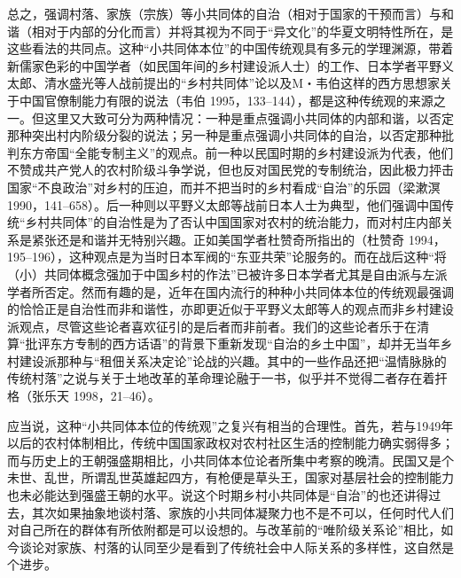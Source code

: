 \documentclass[a4paper,12pt,punct=kaiming,fontset=none]{ctexart}
\begin{document}
总之，强调村落、家族（宗族）等小共同体的自治（相对于国家的干预而言）与和谐（相对于内部的分化而言）并将其视为不同于“异文化”的华夏文明特性所在，是这些看法的共同点。这种“小共同体本位”的中国传统观具有多元的学理渊源，带着新儒家色彩的中国学者（如民国年间的乡村建设派人士）的工作、日本学者平野义太郎、清水盛光等人战前提出的“乡村共同体”论以及M・韦伯这样的西方思想家关于中国官僚制能力有限的说法（韦伯 1995，133–144），都是这种传统观的来源之一。但这里又大致可分为两种情况：一种是重点强调小共同体的内部和谐，以否定那种突出村内阶级分裂的说法；另一种是重点强调小共同体的自治，以否定那种批判东方帝国“全能专制主义”的观点。前一种以民国时期的乡村建设派为代表，他们不赞成共产党人的农村阶级斗争学说，但也反对国民党的专制统治，因此极力抨击国家“不良政治”对乡村的压迫，而并不把当时的乡村看成“自治”的乐园（梁漱溟 1990，141–658）。后一种则以平野义太郎等战前日本人士为典型，他们强调中国传统“乡村共同体”的自治性是为了否认中国国家对农村的统治能力，而对村庄内部关系是紧张还是和谐并无特别兴趣。正如美国学者杜赞奇所指出的（杜赞奇 1994，195–196），这种观点是为当时日本军阀的“东亚共荣”论服务的。而在战后这种“将（小）共同体概念强加于中国乡村的作法”已被许多日本学者尤其是自由派与左派学者所否定。然而有趣的是，近年在国内流行的种种小共同体本位的传统观最强调的恰恰正是自治性而非和谐性，亦即更近似于平野义太郎等人的观点而非乡村建设派观点，尽管这些论者喜欢征引的是后者而非前者。我们的这些论者乐于在清算“批评东方专制的西方话语”的背景下重新发现“自治的乡土中国”，却并无当年乡村建设派那种与“租佃关系决定论”论战的兴趣。其中的一些作品还把“温情脉脉的传统村落”之说与关于土地改革的革命理论融于一书，似乎并不觉得二者存在着扞格（张乐天 1998，21–46）。

应当说，这种“小共同体本位的传统观”之复兴有相当的合理性。首先，若与1949年以后的农村体制相比，传统中国国家政权对农村社区生活的控制能力确实弱得多；而与历史上的王朝强盛期相比，小共同体本位论者所集中考察的晚清。民国又是个未世、乱世，所谓乱世英雄起四方，有枪便是草头王，国家对基层社会的控制能力也未必能达到强盛王朝的水平。说这个时期乡村小共同体是“自治”的也还讲得过去，其次如果抽象地谈村落、家族的小共同体凝聚力也不是不可以，任何时代人们对自己所在的群体有所依附都是可以设想的。与改革前的“唯阶级关系论”相比，如今谈论对家族、村落的认同至少是看到了传统社会中人际关系的多样性，这自然是个进步。
\end{document}
